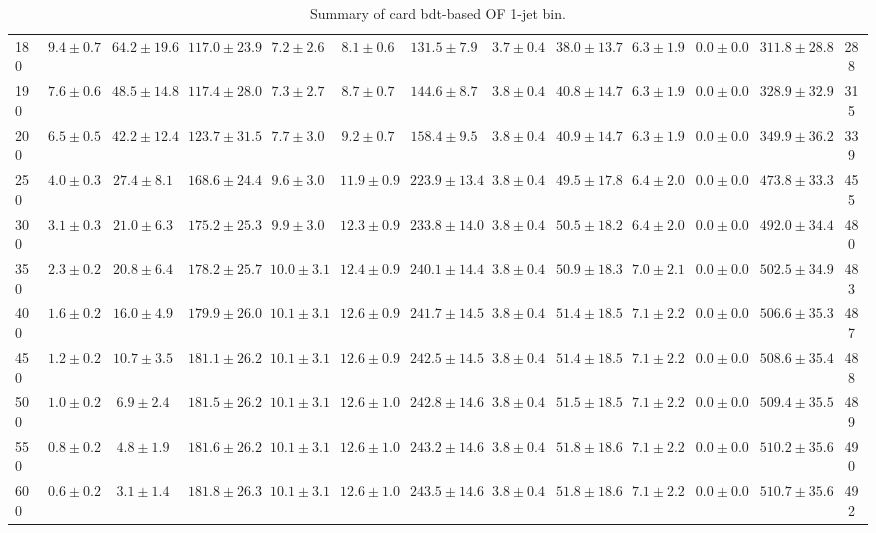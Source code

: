 \begin{table}
{\begin{center}
\begin{tabular}{l | c c | c c c c c c c c  | c c}
180 & $9.4\pm0.7$ & $64.2\pm19.6$ & $117.0\pm23.9$ & $7.2\pm2.6$ & $8.1\pm0.6$ & $131.5\pm7.9$ & $3.7\pm0.4$ & $38.0\pm13.7$ & $6.3\pm1.9$ & $0.0\pm0.0$ & $311.8\pm28.8$ & 288 \\
190 & $7.6\pm0.6$ & $48.5\pm14.8$ & $117.4\pm28.0$ & $7.3\pm2.7$ & $8.7\pm0.7$ & $144.6\pm8.7$ & $3.8\pm0.4$ & $40.8\pm14.7$ & $6.3\pm1.9$ & $0.0\pm0.0$ & $328.9\pm32.9$ & 315 \\
200 & $6.5\pm0.5$ & $42.2\pm12.4$ & $123.7\pm31.5$ & $7.7\pm3.0$ & $9.2\pm0.7$ & $158.4\pm9.5$ & $3.8\pm0.4$ & $40.9\pm14.7$ & $6.3\pm1.9$ & $0.0\pm0.0$ & $349.9\pm36.2$ & 339 \\
250 & $4.0\pm0.3$ & $27.4\pm8.1$ & $168.6\pm24.4$ & $9.6\pm3.0$ & $11.9\pm0.9$ & $223.9\pm13.4$ & $3.8\pm0.4$ & $49.5\pm17.8$ & $6.4\pm2.0$ & $0.0\pm0.0$ & $473.8\pm33.3$ & 455 \\
300 & $3.1\pm0.3$ & $21.0\pm6.3$ & $175.2\pm25.3$ & $9.9\pm3.0$ & $12.3\pm0.9$ & $233.8\pm14.0$ & $3.8\pm0.4$ & $50.5\pm18.2$ & $6.4\pm2.0$ & $0.0\pm0.0$ & $492.0\pm34.4$ & 480 \\
350 & $2.3\pm0.2$ & $20.8\pm6.4$ & $178.2\pm25.7$ & $10.0\pm3.1$ & $12.4\pm0.9$ & $240.1\pm14.4$ & $3.8\pm0.4$ & $50.9\pm18.3$ & $7.0\pm2.1$ & $0.0\pm0.0$ & $502.5\pm34.9$ & 483 \\
400 & $1.6\pm0.2$ & $16.0\pm4.9$ & $179.9\pm26.0$ & $10.1\pm3.1$ & $12.6\pm0.9$ & $241.7\pm14.5$ & $3.8\pm0.4$ & $51.4\pm18.5$ & $7.1\pm2.2$ & $0.0\pm0.0$ & $506.6\pm35.3$ & 487 \\
450 & $1.2\pm0.2$ & $10.7\pm3.5$ & $181.1\pm26.2$ & $10.1\pm3.1$ & $12.6\pm0.9$ & $242.5\pm14.5$ & $3.8\pm0.4$ & $51.4\pm18.5$ & $7.1\pm2.2$ & $0.0\pm0.0$ & $508.6\pm35.4$ & 488 \\
500 & $1.0\pm0.2$ & $6.9\pm2.4$ & $181.5\pm26.2$ & $10.1\pm3.1$ & $12.6\pm1.0$ & $242.8\pm14.6$ & $3.8\pm0.4$ & $51.5\pm18.5$ & $7.1\pm2.2$ & $0.0\pm0.0$ & $509.4\pm35.5$ & 489 \\
550 & $0.8\pm0.2$ & $4.8\pm1.9$ & $181.6\pm26.2$ & $10.1\pm3.1$ & $12.6\pm1.0$ & $243.2\pm14.6$ & $3.8\pm0.4$ & $51.8\pm18.6$ & $7.1\pm2.2$ & $0.0\pm0.0$ & $510.2\pm35.6$ & 490 \\
600 & $0.6\pm0.2$ & $3.1\pm1.4$ & $181.8\pm26.3$ & $10.1\pm3.1$ & $12.6\pm1.0$ & $243.5\pm14.6$ & $3.8\pm0.4$ & $51.8\pm18.6$ & $7.1\pm2.2$ & $0.0\pm0.0$ & $510.7\pm35.6$ & 492 \\
\hline
\end{tabular}
\end{center}
}
\caption{Summary of card bdt-based OF 1-jet bin.}
\end{table}

